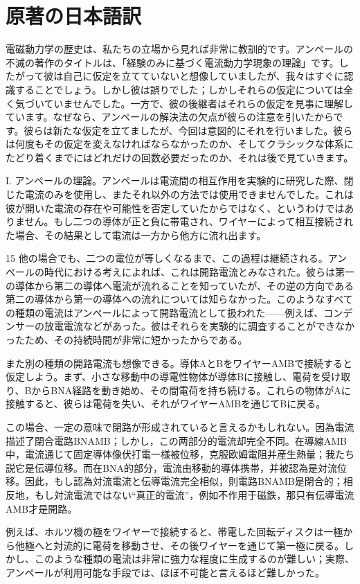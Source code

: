 \documentclass[a4paper,11pt,openany]{ltjsbook}
\begin{document}
\section{原著の日本語訳}
電磁動力学の歴史は、私たちの立場から見れば非常に教訓的です。アンペールの不滅の著作のタイトルは、「経験のみに基づく電流動力学現象の理論」です。したがって彼は自己に仮定を立てていないと想像していましたが、我々はすぐに認識することでしょう。しかし彼は誤りでした；しかしそれらの仮定については全く気づいていませんでした。一方で、彼の後継者はそれらの仮定を見事に理解しています。なぜなら、アンペールの解決法の欠点が彼らの注意を引いたからです。彼らは新たな仮定を立てましたが、今回は意図的にそれを行いました。彼らは何度もその仮定を変えなければならなかったのか、そしてクラシックな体系にたどり着くまでにはどれだけの回数必要だったのか、それは後で見ていきます。

I. アンペールの理論。アンペールは電流間の相互作用を実験的に研究した際、閉じた電流のみを使用し、またそれ以外の方法では使用できませんでした。これは彼が開いた電流の存在や可能性を否定していたからではなく、というわけではありません。もし二つの導体が正と負に帯電され、ワイヤーによって相互接続された場合、その結果として電流は一方から他方に流れ出ます。

15 他の場合でも、二つの電位が等しくなるまで、この過程は継続される。アンペールの時代における考えによれば、これは開路電流とみなされた。彼らは第一の導体から第二の導体へ電流が流れることを知っていたが、その逆の方向である第二の導体から第一の導体への流れについては知らなかった。このようなすべての種類の電流はアンペールによって開路電流として扱われた——例えば、コンデンサーの放電電流などがあった。彼はそれらを実験的に調査することができなかったため、その持続時間が非常に短かったからである。

また別の種類の開路電流も想像できる。導体AとBをワイヤーAMBで接続すると仮定しよう。まず、小さな移動中の導電性物体が導体Bに接触し、電荷を受け取り、BからBNA経路を動き始め、その間電荷を持ち続ける。これらの物体がAに接触すると、彼らは電荷を失い、それがワイヤーAMBを通じてBに戻る。

この場合、一定の意味で閉路が形成されていると言えるかもしれない。因為電流描述了閉合電路BNAMB；しかし，この两部分的電流却完全不同。在導線AMB中，電流通じて固定導体像伏打電一様被位移，克服欧姆電阻并産生熱量；我たち説它是伝導位移。而在BNA的部分，電流由移動的導体携帯，并被認為是対流位移。因此，もし認為対流電流と伝導電流完全相似，則電路BNAMB是閉合的；相反地，もし対流電流ではない“真正的電流”，例如不作用于磁鉄，那只有伝導電流AMB才是開路。

例えば、ホルツ機の極をワイヤーで接続すると、帯電した回転ディスクは一極から他極へと対流的に電荷を移動させ、その後ワイヤーを通じて第一極に戻る。しかし、このような種類の電流は非常に強力な程度に生成するのが難しい；実際、アンペールが利用可能な手段では、ほぼ不可能と言えるほど難しかった。
\end{document}
